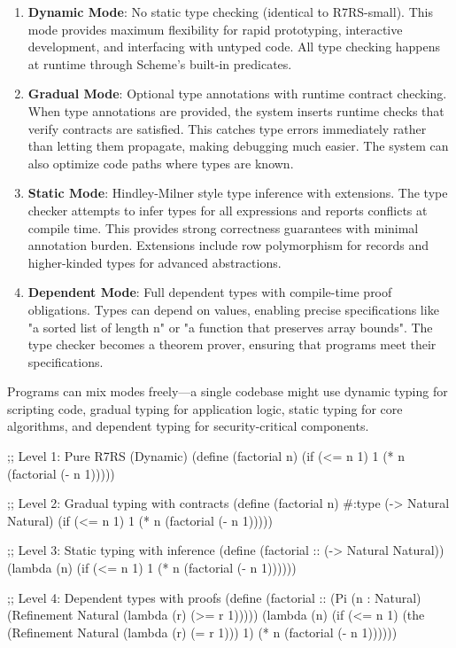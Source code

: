 \begin{enumerate}
\item \textbf{Dynamic Mode}: No static type checking (identical to R7RS-small). This mode provides maximum flexibility for rapid prototyping, interactive development, and interfacing with untyped code. All type checking happens at runtime through Scheme's built-in predicates.

\item \textbf{Gradual Mode}: Optional type annotations with runtime contract checking. When type annotations are provided, the system inserts runtime checks that verify contracts are satisfied. This catches type errors immediately rather than letting them propagate, making debugging much easier. The system can also optimize code paths where types are known.

\item \textbf{Static Mode}: Hindley-Milner style type inference with extensions. The type checker attempts to infer types for all expressions and reports conflicts at compile time. This provides strong correctness guarantees with minimal annotation burden. Extensions include row polymorphism for records and higher-kinded types for advanced abstractions.

\item \textbf{Dependent Mode}: Full dependent types with compile-time proof obligations. Types can depend on values, enabling precise specifications like "a sorted list of length n" or "a function that preserves array bounds". The type checker becomes a theorem prover, ensuring that programs meet their specifications.
\end{enumerate}

Programs can mix modes freely—a single codebase might use dynamic typing for scripting code, gradual typing for application logic, static typing for core algorithms, and dependent typing for security-critical components.

\begin{example}
\begin{lambdustcode}
;; Level 1: Pure R7RS (Dynamic)
(define (factorial n)
  (if (<= n 1) 1 (* n (factorial (- n 1)))))

;; Level 2: Gradual typing with contracts
(define (factorial n)
  #:type (-> Natural Natural)
  (if (<= n 1) 1 (* n (factorial (- n 1)))))

;; Level 3: Static typing with inference
(define (factorial :: (-> Natural Natural))
  (lambda (n)
    (if (<= n 1) 1 (* n (factorial (- n 1))))))

;; Level 4: Dependent types with proofs
(define (factorial :: (Pi (n : Natural) 
                          (Refinement Natural (lambda (r) (>= r 1)))))
  (lambda (n)
    (if (<= n 1) 
        (the (Refinement Natural (lambda (r) (= r 1))) 1)
        (* n (factorial (- n 1))))))
\end{lambdustcode}
\end{example}

